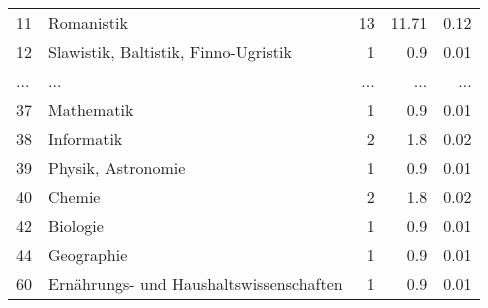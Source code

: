 \begin{longtable}{lXrrr}
        11 & \multicolumn{1}{X}{Romanistik} & %
          \num{13} &
          \num[round-mode=places,round-precision=2]{11.71} &
          \num[round-mode=places,round-precision=2]{0.12} \\
        12 & \multicolumn{1}{X}{Slawistik, Baltistik, Finno-Ugristik} & %
          \num{1} &
          \num[round-mode=places,round-precision=2]{0.9} &
          \num[round-mode=places,round-precision=2]{0.01} \\
       ... & ... & ... & ... & ... \\
        37 & \multicolumn{1}{X}{Mathematik} & %
          \num{1} &
          \num[round-mode=places,round-precision=2]{0.9} &
          \num[round-mode=places,round-precision=2]{0.01} \\

        38 & \multicolumn{1}{X}{Informatik} & %
          \num{2} &
          \num[round-mode=places,round-precision=2]{1.8} &
          \num[round-mode=places,round-precision=2]{0.02} \\

        39 & \multicolumn{1}{X}{Physik, Astronomie} & %
          \num{1} &
          \num[round-mode=places,round-precision=2]{0.9} &
          \num[round-mode=places,round-precision=2]{0.01} \\

        40 & \multicolumn{1}{X}{Chemie} & %
          \num{2} &
          \num[round-mode=places,round-precision=2]{1.8} &
          \num[round-mode=places,round-precision=2]{0.02} \\

        42 & \multicolumn{1}{X}{Biologie} & %
          \num{1} &
          \num[round-mode=places,round-precision=2]{0.9} &
          \num[round-mode=places,round-precision=2]{0.01} \\

        44 & \multicolumn{1}{X}{Geographie} & %
          \num{1} &
          \num[round-mode=places,round-precision=2]{0.9} &
          \num[round-mode=places,round-precision=2]{0.01} \\

        60 & \multicolumn{1}{X}{Ernährungs- und Haushaltswissenschaften} & %
          \num{1} &
          \num[round-mode=places,round-precision=2]{0.9} &
          \num[round-mode=places,round-precision=2]{0.01} \\


\end{longtable}
